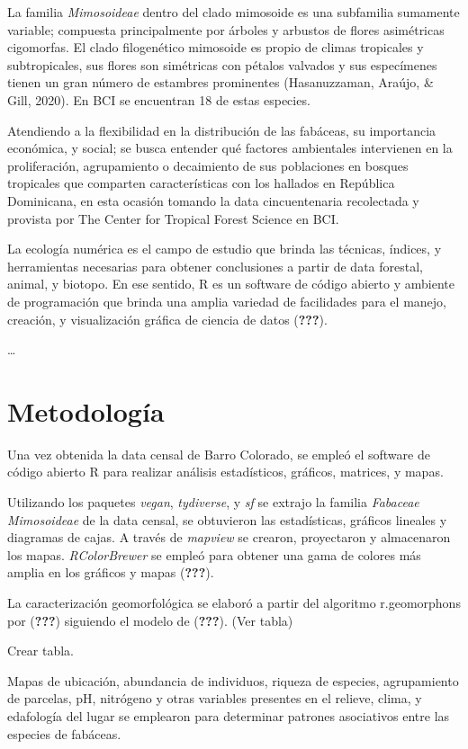 \documentclass[11pt,]{article}
\begin{document}
La familia \emph{Mimosoideae} dentro del clado mimosoide es una
subfamilia sumamente variable; compuesta principalmente por árboles y
arbustos de flores asimétricas cigomorfas. El clado filogenético
mimosoide es propio de climas tropicales y subtropicales, sus flores son
simétricas con pétalos valvados y sus especímenes tienen un gran número
de estambres prominentes (Hasanuzzaman, Araújo, \& Gill, 2020). En BCI
se encuentran 18 de estas especies.

Atendiendo a la flexibilidad en la distribución de las fabáceas, su
importancia económica, y social; se busca entender qué factores
ambientales intervienen en la proliferación, agrupamiento o decaimiento
de sus poblaciones en bosques tropicales que comparten características
con los hallados en República Dominicana, en esta ocasión tomando la
data cincuentenaria recolectada y provista por The Center for Tropical
Forest Science en BCI.

La ecología numérica es el campo de estudio que brinda las técnicas,
índices, y herramientas necesarias para obtener conclusiones a partir de
data forestal, animal, y biotopo. En ese sentido, R es un software de
código abierto y ambiente de programación que brinda una amplia variedad
de facilidades para el manejo, creación, y visualización gráfica de
ciencia de datos ({\textbf{???}}).

\ldots

\section{Metodología}\label{metodologuxeda}

Una vez obtenida la data censal de Barro Colorado, se empleó el software
de código abierto R para realizar análisis estadísticos, gráficos,
matrices, y mapas.

Utilizando los paquetes \emph{vegan}, \emph{tydiverse}, y \emph{sf} se
extrajo la familia \emph{Fabaceae Mimosoideae} de la data censal, se
obtuvieron las estadísticas, gráficos lineales y diagramas de cajas. A
través de \emph{mapview} se crearon, proyectaron y almacenaron los
mapas. \emph{RColorBrewer} se empleó para obtener una gama de colores
más amplia en los gráficos y mapas ({\textbf{???}}).

La caracterización geomorfológica se elaboró a partir del algoritmo
r.geomorphons por ({\textbf{???}}) siguiendo el modelo de
({\textbf{???}}). (Ver tabla)

Crear tabla.

Mapas de ubicación, abundancia de individuos, riqueza de especies,
agrupamiento de parcelas, pH, nitrógeno y otras variables presentes en
el relieve, clima, y edafología del lugar se emplearon para determinar
patrones asociativos entre las especies de fabáceas.
\end{document}
